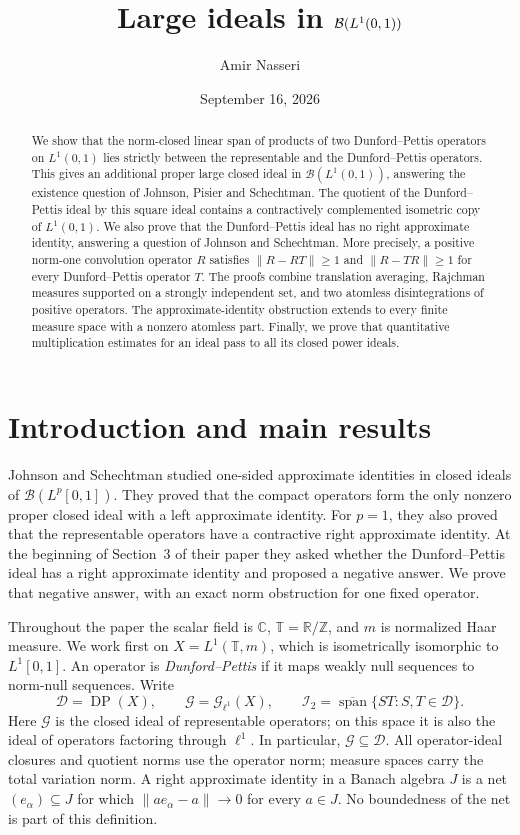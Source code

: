 \documentclass[11pt,reqno]{amsart}
\title[Large ideals in $\B(L^1(0,1))$]{Large ideals in $\B(L^1(0,1))$}
\author{Amir Nasseri}
\date{September 16, 2026}
\theoremstyle{definition}
\theoremstyle{remark}
\newcommand{\T}{\mathbb T}
\newcommand{\C}{\mathbb C}
\newcommand{\B}{\mathcal B}
\newcommand{\D}{\mathcal D}
\newcommand{\G}{\mathcal G}
\newcommand{\I}{\mathcal I}
\newcommand{\DP}{\operatorname{DP}}
\newcommand{\clspan}{\overline{\operatorname{span}}}
\begin{document}
\begin{abstract}
We show that the norm-closed linear span of products of two Dunford--Pettis operators on $L^1(0,1)$ lies strictly between the representable and the Dunford--Pettis operators. This gives an additional proper large closed ideal in $\B(L^1(0,1))$, answering the existence question of Johnson, Pisier and Schechtman. The quotient of the Dunford--Pettis ideal by this square ideal contains a contractively complemented isometric copy of $L^1(0,1)$. We also prove that the Dunford--Pettis ideal has no right approximate identity, answering a question of Johnson and Schechtman. More precisely, a positive norm-one convolution operator $R$ satisfies $\|R-RT\|\geq1$ and $\|R-TR\|\geq1$ for every Dunford--Pettis operator $T$. The proofs combine translation averaging, Rajchman measures supported on a strongly independent set, and two atomless disintegrations of positive operators. The approximate-identity obstruction extends to every finite measure space with a nonzero atomless part. Finally, we prove that quantitative multiplication estimates for an ideal pass to all its closed power ideals.
\end{abstract}
\maketitle

\section{Introduction and main results}

Johnson and Schechtman \cite{JS} studied one-sided approximate identities in closed ideals of $\B(L^p[0,1])$. They proved that the compact operators form the only nonzero proper closed ideal with a left approximate identity. For $p=1$, they also proved that the representable operators have a contractive right approximate identity. At the beginning of Section~3 of their paper they asked whether the Dunford--Pettis ideal has a right approximate identity and proposed a negative answer. We prove that negative answer, with an exact norm obstruction for one fixed operator.

Throughout the paper the scalar field is $\C$, $\T=\mathbb R/\mathbb Z$, and $m$ is normalized Haar measure. We work first on $X=L^1(\T,m)$, which is isometrically isomorphic to $L^1[0,1]$. An operator is \emph{Dunford--Pettis} if it maps weakly null sequences to norm-null sequences. Write
\[
 \D=\DP(X),\qquad
 \G=\G_{\ell^1}(X),\qquad
 \I_2=\clspan\{ST:S,T\in\D\}.
\]
Here $\G$ is the closed ideal of representable operators; on this space it is also the ideal of operators factoring through $\ell^1$. In particular, $\G\subseteq\D$. All operator-ideal closures and quotient norms use the operator norm; measure spaces carry the total variation norm. A right approximate identity in a Banach algebra $J$ is a net $(e_\alpha)\subseteq J$ for which $\|ae_\alpha-a\|\to0$ for every $a\in J$. No boundedness of the net is part of this definition.
\end{document}
